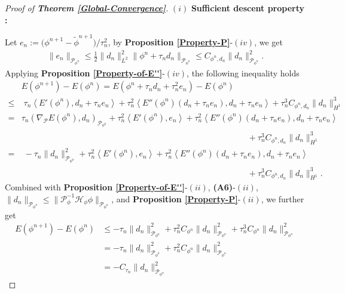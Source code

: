 \documentclass[preprint,3p]{elsarticle}
\begin{document}
\begin{proof}[Proof of {\bf Theorem \ref{Global-Convergence}}]
	$(i)$ {\bf Sufficient descent property :}
	
	Let $e_n:=\big(\phi^{n+1}-\widetilde{\phi}^{n+1}\big)\big/\tau_n^2$, by {\bf Proposition \ref{Property-P}}-$(iv)$, we get 
	\begin{align}\label{e_n}
		\|e_n\|_{\mathcal{P}_{\phi^n}}\le\frac{1}{2}\|d_n\|^2_{L^2}\big\|\phi^n+\tau_nd_n\big\|_{\mathcal{P}_{\phi^n}}\le C_{\phi^n,d_n}\|d_n\|^2_{\mathcal{P}_{\phi^n}}.
	\end{align}
	Applying {\bf Proposition \ref{Property-of-E''}}-$(iv)$, the following inequality holds
	\begin{align*}
		&E(\phi^{n+1})-E(\phi^n)=E(\phi^n+\tau_nd_n+\tau_n^2e_n)-E(\phi^n)\\
		\le&\;\tau_n\left\langle E'(\phi^n), d_n+\tau_ne_n\right\rangle+\tau_n^2\left\langle E''(\phi^n)(d_n+\tau_ne_n),d_n+\tau_ne_n\right\rangle+\tau_n^3C_{\phi^n,d_n}\|d_n\|_{H^1}^3\\
		=&\tau_n\left(\nabla_{\mathcal{P}}E(\phi^n),d_n\right)_{\mathcal{P}_{\phi^n}}+\tau^2_n\left\langle E'(\phi^n),e_n\right\rangle+\tau_n^2\left\langle E''(\phi^n)(d_n+\tau_ne_n),d_n+\tau_ne_n\right\rangle\\
		&\qquad\qquad\qquad\qquad\qquad\qquad\qquad\qquad\qquad\qquad\qquad\qquad\qquad\quad+\tau_n^3C_{\phi^n,d_n}\|d_n\|^3_{H^1}\\
		=&\;-\tau_n\|d_n\|^2_{\mathcal{P}_{\phi^n}}+\tau^2_n\left\langle E'(\phi^n),e_n\right\rangle+\tau_n^2\left\langle E''(\phi^n)(d_n+\tau_ne_n),d_n+\tau_ne_n\right\rangle\\
		&\qquad\qquad\qquad\qquad\qquad\qquad\qquad\qquad\qquad\qquad\qquad\qquad\qquad\quad+\tau_n^3C_{\phi^n,d_n}\|d_n\|^3_{H^1}.
	\end{align*}
	Combined with {\bf Proposition \ref{Property-of-E''}}-$(ii)$, {\bf (A6)}-$(ii)$, $\|d_n\|_{\mathcal{P}_{\phi^n}}\le\big\|\mathcal{P}_{\phi}^{-1}\mathcal{H}_{\phi}\phi\big\|_{\mathcal{P}_{\phi^n}}$, and {\bf Proposition \ref{Property-P}}-$(ii)$, we further get
	\begin{align*}
		E(\phi^{n+1})-E(\phi^n)&\le-\tau_n\|d_n\|^2_{\mathcal{P}_{\phi^n}}+\tau_n^2C_{\phi^n}\|d_n\|^2_{\mathcal{P}_{\phi^n}}+\tau_n^3C_{\phi^n}\|d_n\|^2_{\mathcal{P}_{\phi^n}}\\
		\nonumber&=-\tau_n\|d_n\|^2_{\mathcal{P}_{\phi^n}}+\tau_n^2 C_{\phi^n}\|d_n\|^2_{\mathcal{P}_{\phi^n}}\\
		&=-C_{\tau_n}\|d_n\|^2_{\mathcal{P}_{\phi^n}}

\end{align*}
\end{proof}
\end{document}
